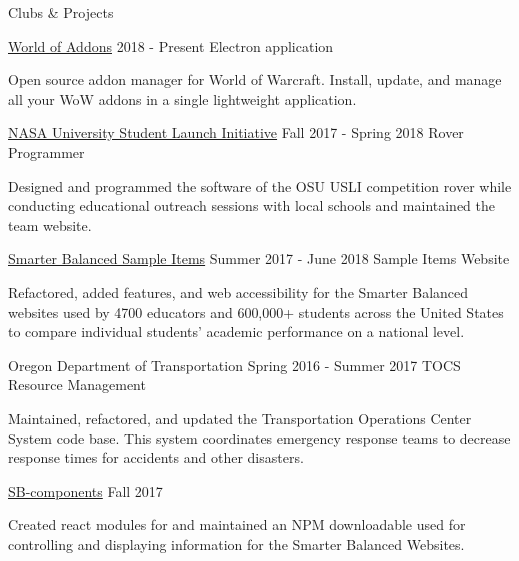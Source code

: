 \documentclass{resume} %
\begin{document}
\begin{rSection}{Clubs \& Projects}

  \begin{rSubsection} {\href{https://github.com/WorldofAddons/worldofaddons}{World of Addons}} {2018 - Present} {Electron application} {}
  \item Open source addon manager for World of Warcraft. Install, update, and manage all your WoW addons in a single lightweight application.
  \end{rSubsection}
  
  \begin{rSubsection} {\href{http://osuusli.com}{NASA University Student Launch Initiative}} {Fall 2017 - Spring 2018} {Rover Programmer} {}
  \item Designed and programmed the software of the OSU USLI competition rover while conducting educational outreach sessions with local schools and maintained the team website.
  \end{rSubsection}

  \begin{rSubsection} {\href{http://sampleitems.smarterbalanced.org}{Smarter Balanced Sample Items}} {Summer 2017 - June 2018} {Sample Items Website} {}
  \item Refactored, added features, and web accessibility for the Smarter Balanced websites used by 4700 educators and 600,000+ students across the United States to compare individual students' academic performance on a national level.
  \end{rSubsection}

  \begin{rSubsection} {Oregon Department of Transportation} {Spring 2016 - Summer 2017} {TOCS Resource Management} {}
  \item Maintained, refactored, and updated the Transportation Operations Center System code base. This system coordinates emergency response teams to decrease response times for accidents and other disasters.
  \end{rSubsection}

  \begin{rSubsection} {\href{https://www.npmjs.com/package/@osu-cass/sb-components}{SB-components}} {Fall 2017} {} {}
  \item Created react modules for and maintained an NPM downloadable used for controlling and displaying information for the Smarter Balanced Websites.
  \end{rSubsection}

\end{rSection}
\end{document}
